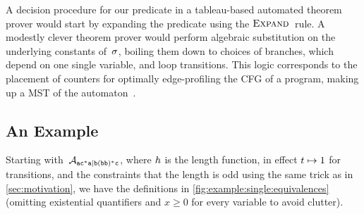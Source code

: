 \documentclass[acmsmall,review,anonymous,screen]{acmart}\settopmatter{printfolios=true,printccs=false,printacmref=true}
\theoremstyle{definition}
\begin{document}
A decision procedure for our predicate in a tableau-based automated theorem
prover would start by expanding the predicate using the $\textsc{Expand}{}$~rule. A
modestly clever theorem prover would perform algebraic substitution on the
underlying constants of~$\operatorname{\sigma}$, boiling them down to choices of branches,
which depend on one single variable, and loop transitions. This logic
corresponds to the placement of counters for optimally edge-profiling the CFG of
a program, making up a MST of the automaton~\cite{path-profiling}.

\subsection{An Example}

Starting with~$\mathcal{A}_{\mathtt{ac^*a|b(bb)^*c}}{}$, where $h$ is the length function, in effect
$t \mapsto 1$ for transitions, and the constraints that the length is
odd using the same trick as in \cref{sec:motivation}, we have the
definitions in \cref{fig:example:single:equivalences} (omitting existential
quantifiers and $x \geq 0$ for every variable to avoid clutter).
\end{document}
